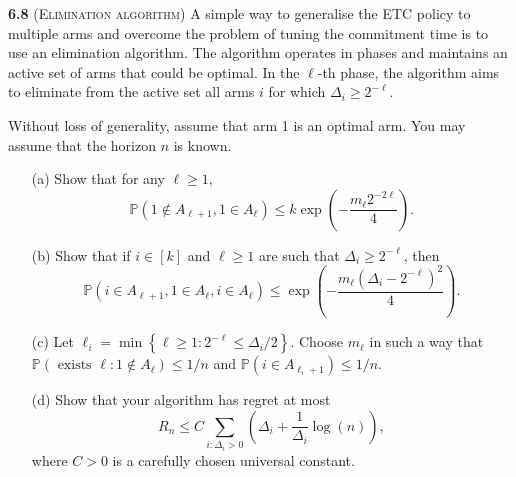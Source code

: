 \noindent\textbf{6.8} (\textsc{Elimination algorithm})
A simple way to generalise the ETC policy to multiple arms and overcome the problem of tuning the commitment time is to use an elimination algorithm.
The algorithm operates in phases and maintains an active set of arms that could be optimal.
In the $\ell$-th phase, the algorithm aims to eliminate from the active set all arms $i$ for which $\Delta_{i} \geq 2^{-\ell}$.

Without loss of generality, assume that arm 1 is an optimal arm.
You may assume that the horizon $n$ is known.

\begin{enumerate}
    \item[(a)] Show that for any $\ell \geq 1$,
    $$\mathbb{P}\left(1 \notin A_{\ell+1}, 1 \in A_{\ell}\right) \leq k \exp \left(-\frac{m_{\ell} 2^{-2 \ell}}{4}\right).$$

    \item[(b)] Show that if $i \in[k]$ and $\ell \geq 1$ are such that $\Delta_{i} \geq 2^{-\ell}$, then
    $$\mathbb{P}\left(i \in A_{\ell+1}, 1 \in A_{\ell}, i \in A_{\ell}\right) \leq \exp \left(-\frac{m_{\ell}\left(\Delta_{i}-2^{-\ell}\right)^{2}}{4}\right).$$ 
    
    \item[(c)] Let $\ell_{i}=\min \left\{\ell \geq 1: 2^{-\ell} \leq \Delta_{i} / 2\right\}$.
    Choose $m_\ell$ in such a way that $\mathbb{P}\left(\text { exists } \ell: 1 \notin A_{\ell}\right) \leq 1 / n$ and $\mathbb{P}\left(i \in A_{\ell_{i}+1}\right) \leq 1 / n$.

    \item[(d)] Show that your algorithm has regret at most
    $$R_{n} \leq C \sum_{i: \Delta_{i}>0}\left(\Delta_{i}+\frac{1}{\Delta_{i}} \log (n)\right),$$
    where $C>0$ is a carefully chosen universal constant. 
\end{enumerate}

